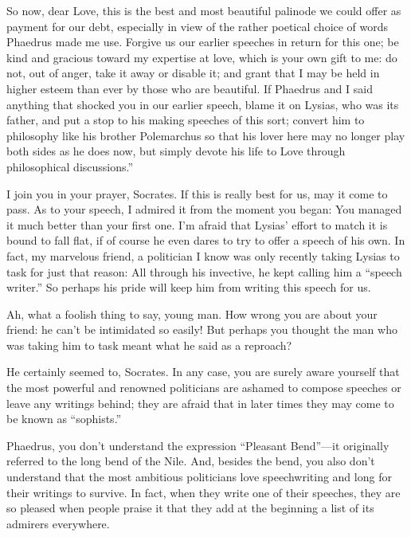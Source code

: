 So now, dear Love, this is the best and most beautiful
palinode we could
offer as payment for our debt, especially in view of the rather poetical
choice of words Phaedrus made me
use. Forgive us our
earlier speeches in return for this one; be kind and gracious toward my
expertise at love, which is your own gift to me: do not, out of anger,
take it away or disable it; and grant that I may be held in higher
esteem than ever by those who are beautiful. If Phaedrus and I
said anything that shocked you in our earlier speech, blame it on
Lysias, who was its father, and put a stop to his making speeches of
this sort; convert him to philosophy like his brother Polemarchus so
that his lover here may no longer play both sides as he does now, but
simply devote his life to Love through philosophical discussions.”

\sayphaedrus I join you in your prayer, Socrates. If this is really
best for us, may it come to pass. As to your speech, I admired it from
the moment you began: You managed it much better than your first one.
I’m afraid that Lysias’ effort to match it is bound to fall flat, if of
course he even dares to try to offer a speech of his own. In fact, my
marvelous friend, a politician I know was only recently taking Lysias to
task for just that reason: All through his invective, he kept calling
him a “speech writer.” So perhaps his pride will keep him from writing
this speech for us.

\saysocrates Ah, what a foolish thing to say, young man. How wrong
you are about your friend: he can’t be intimidated so easily! But
perhaps you thought the man who was taking him to task meant what he
said as a reproach?

\sayphaedrus He certainly seemed to, Socrates. In any case, you are surely
aware yourself that the most powerful and renowned politicians are
ashamed to compose speeches or leave any writings behind; they are
afraid that in later times they may come to be known as “sophists.”

\saysocrates Phaedrus, you don’t understand the expression “Pleasant 
Bend”---it originally referred to the long bend of the
Nile. And, besides the
bend, you also don’t understand that the most ambitious politicians love
speechwriting and long for their writings to survive. In fact, when they
write one of their speeches, they are so pleased when people praise it
that they add at the beginning a list of its admirers everywhere.

